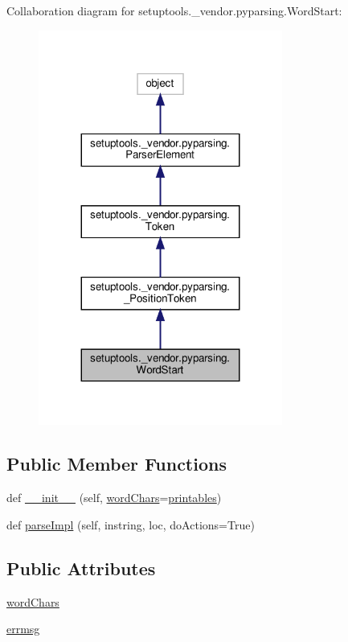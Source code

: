 Collaboration diagram for setuptools.\+\_\+vendor.\+pyparsing.\+Word\+Start\+:
\nopagebreak
\begin{figure}[H]
\begin{center}
\leavevmode
\includegraphics[width=227pt]{classsetuptools_1_1__vendor_1_1pyparsing_1_1WordStart__coll__graph}
\end{center}
\end{figure}
\subsection*{Public Member Functions}
\begin{DoxyCompactItemize}
\item 
def \hyperlink{classsetuptools_1_1__vendor_1_1pyparsing_1_1WordStart_a0a024c22e76cec265febde6079752d71}{\+\_\+\+\_\+init\+\_\+\+\_\+} (self, \hyperlink{classsetuptools_1_1__vendor_1_1pyparsing_1_1WordStart_a60a6ec3f13aebc95e8f67771765ca6cf}{word\+Chars}=\hyperlink{namespacesetuptools_1_1__vendor_1_1pyparsing_a0a5e033cd7141a5a856b879c7b6e730f}{printables})
\item 
def \hyperlink{classsetuptools_1_1__vendor_1_1pyparsing_1_1WordStart_a2d8d791c73a75427d597bdc7a7de8e0c}{parse\+Impl} (self, instring, loc, do\+Actions=True)
\end{DoxyCompactItemize}
\subsection*{Public Attributes}
\begin{DoxyCompactItemize}
\item 
\hyperlink{classsetuptools_1_1__vendor_1_1pyparsing_1_1WordStart_a60a6ec3f13aebc95e8f67771765ca6cf}{word\+Chars}
\item 
\hyperlink{classsetuptools_1_1__vendor_1_1pyparsing_1_1WordStart_ae6fee1a4db4b49e5cbf4ca20951b7269}{errmsg}
\end{DoxyCompactItemize}
